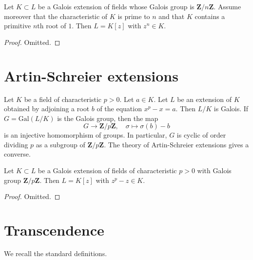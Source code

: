\begin{lemma}
\label{lemma-Kummer}
Let $K \subset L$ be a Galois extension of fields whose Galois group is
$\mathbf{Z}/n\mathbf{Z}$. Assume moreover that the characteristic of $K$
is prime to $n$ and that $K$ contains a primitive $n$th root of $1$.
Then $L = K[z]$ with $z^n \in K$.
\end{lemma}

\begin{proof}
Omitted.
\end{proof}




\section{Artin-Schreier extensions}
\label{section-Artin-Schreier}

\noindent
Let $K$ be a field of characteristic $p > 0$. Let $a \in K$. Let $L$ be an
extension of $K$ obtained by adjoining a root $b$ of the equation
$x^p - x = a$. Then $L/K$ is Galois. If $G = \text{Gal}(L/K)$ is the Galois
group, then the map
$$
G \longrightarrow \mathbf{Z}/p\mathbf{Z},\quad
\sigma \longmapsto \sigma(b) - b
$$
is an injective homomorphism of groups. In particular, $G$ is cyclic
of order dividing $p$ as a subgroup of $\mathbf{Z}/p\mathbf{Z}$.
The theory of Artin-Schreier extensions gives a converse.

\begin{lemma}
\label{lemma-Artin-Schreier}
Let $K \subset L$ be a Galois extension of fields of characteristic $p > 0$
with Galois group $\mathbf{Z}/p\mathbf{Z}$. Then $L = K[z]$ with
$z^p - z \in K$.
\end{lemma}

\begin{proof}
Omitted.
\end{proof}



\section{Transcendence}
\label{section-transcendence}

\noindent
We recall the standard definitions.

